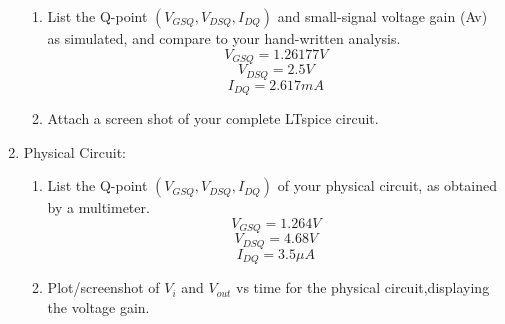 \documentclass{article}
\begin{document}
\begin{enumerate}
\begin{enumerate}
    \item List the Q-point $(V_{GSQ}, V_{DSQ}, I_{DQ})$ and small-signal voltage gain (Av) as simulated, and compare to your hand-written analysis.
    \begin{equation}
        V_{GSQ} = 1.26177V
    \end{equation}
    \begin{equation}
        V_{DSQ} = 2.5V
    \end{equation}
    \begin{equation}
        I_{DQ} = 2.617mA
    \end{equation}
    \item Attach a screen shot of your complete LTspice circuit.
    \begin{center}
    \end{center}
\end{enumerate}
\newpage
\item Physical Circuit:
\begin{enumerate}
    \item List the Q-point $(V_{GSQ}, V_{DSQ}, I_{DQ})$ of your physical circuit, as obtained by a multimeter.
    \begin{equation}
        V_{GSQ} = 1.264V
    \end{equation}
    \begin{equation}
        V_{DSQ} = 4.68V
    \end{equation}
    \begin{equation}
        I_{DQ} = 3.5\mu A
    \end{equation}
    \item Plot/screenshot of $V_i$ and $V_{out}$ vs time for the physical circuit,displaying the voltage gain.
    \begin{center}

\end{center}
\end{enumerate}
\end{enumerate}
\end{document}
